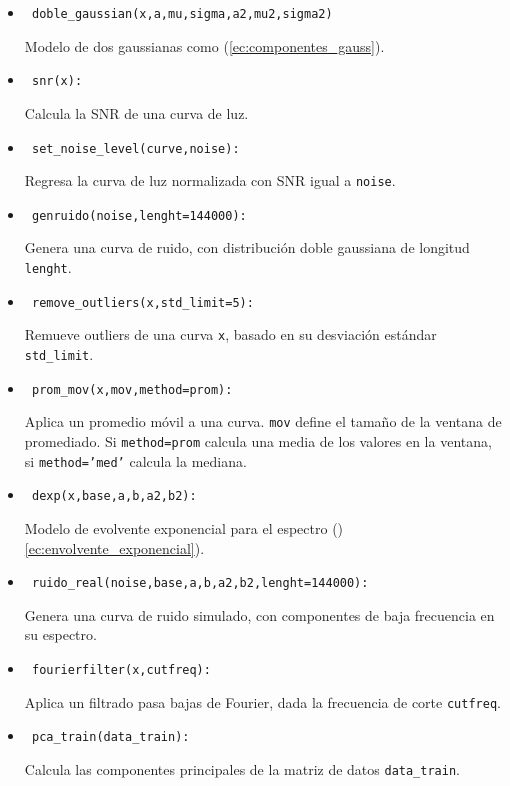 \begin{itemize}
\item \begin{verbatim} doble_gaussian(x,a,mu,sigma,a2,mu2,sigma2) \end{verbatim} Modelo de dos gaussianas como (\ref{ec:componentes_gauss}).
	\item \begin{verbatim} snr(x): \end{verbatim} Calcula la SNR de una curva de luz.
	\item \begin{verbatim} set_noise_level(curve,noise): \end{verbatim} Regresa la curva de luz normalizada con SNR igual a \texttt{noise}.
	\item \begin{verbatim} genruido(noise,lenght=144000): \end{verbatim} Genera una curva de ruido, con distribución doble gaussiana de longitud \texttt{lenght}.
	\item \begin{verbatim} remove_outliers(x,std_limit=5): \end{verbatim} Remueve outliers de una curva \texttt{x}, basado en su desviación estándar \texttt{std\_limit}.
	\item \begin{verbatim} prom_mov(x,mov,method=prom): \end{verbatim} Aplica un promedio móvil a una curva. \texttt{mov} define el tamaño de la ventana de promediado. Si \texttt{method=prom} calcula una media de los valores en la ventana, si \texttt{method='med'} calcula la mediana.
	\item \begin{verbatim} dexp(x,base,a,b,a2,b2): \end{verbatim} Modelo de evolvente exponencial para el espectro ()\ref{ec:envolvente_exponencial}).
	\item \begin{verbatim} ruido_real(noise,base,a,b,a2,b2,lenght=144000): \end{verbatim} Genera una curva de ruido simulado, con componentes de baja frecuencia en su espectro.
	\item \begin{verbatim} fourierfilter(x,cutfreq): \end{verbatim} Aplica un filtrado pasa bajas de Fourier, dada la frecuencia de corte \texttt{cutfreq}.
	\item \begin{verbatim} pca_train(data_train): \end{verbatim} Calcula las componentes principales de la matriz de datos \texttt{data\_train}.

\end{itemize}
